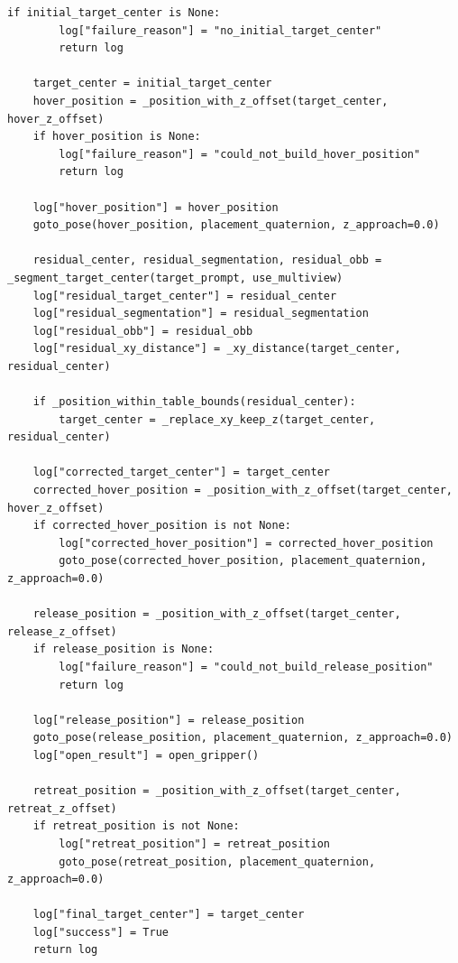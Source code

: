 \documentclass{llmxive}
\begin{document}
\begin{lstlisting}[style=ratsappendixpython]
    if initial_target_center is None:
        log["failure_reason"] = "no_initial_target_center"
        return log

    target_center = initial_target_center
    hover_position = _position_with_z_offset(target_center, hover_z_offset)
    if hover_position is None:
        log["failure_reason"] = "could_not_build_hover_position"
        return log

    log["hover_position"] = hover_position
    goto_pose(hover_position, placement_quaternion, z_approach=0.0)

    residual_center, residual_segmentation, residual_obb = _segment_target_center(target_prompt, use_multiview)
    log["residual_target_center"] = residual_center
    log["residual_segmentation"] = residual_segmentation
    log["residual_obb"] = residual_obb
    log["residual_xy_distance"] = _xy_distance(target_center, residual_center)

    if _position_within_table_bounds(residual_center):
        target_center = _replace_xy_keep_z(target_center, residual_center)

    log["corrected_target_center"] = target_center
    corrected_hover_position = _position_with_z_offset(target_center, hover_z_offset)
    if corrected_hover_position is not None:
        log["corrected_hover_position"] = corrected_hover_position
        goto_pose(corrected_hover_position, placement_quaternion, z_approach=0.0)

    release_position = _position_with_z_offset(target_center, release_z_offset)
    if release_position is None:
        log["failure_reason"] = "could_not_build_release_position"
        return log

    log["release_position"] = release_position
    goto_pose(release_position, placement_quaternion, z_approach=0.0)
    log["open_result"] = open_gripper()

    retreat_position = _position_with_z_offset(target_center, retreat_z_offset)
    if retreat_position is not None:
        log["retreat_position"] = retreat_position
        goto_pose(retreat_position, placement_quaternion, z_approach=0.0)

    log["final_target_center"] = target_center
    log["success"] = True
    return log
\end{lstlisting}
\end{document}
